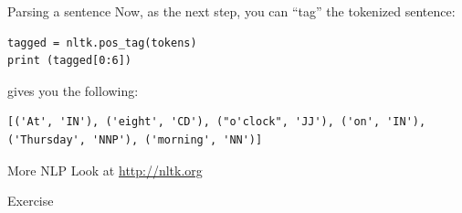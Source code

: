 \documentclass{beamer}
\begin{document}
\begin{frame}[fragile]{Parsing a sentence}
Now, as the next step, you can ``tag'' the tokenized sentence:
\begin{lstlisting}
tagged = nltk.pos_tag(tokens)
print (tagged[0:6])
\end{lstlisting}
gives you the following:
\begin{lstlisting}
[('At', 'IN'), ('eight', 'CD'), ("o'clock", 'JJ'), ('on', 'IN'),
('Thursday', 'NNP'), ('morning', 'NN')]
\end{lstlisting}


\end{frame}


\begin{frame}{More NLP}
\Huge{Look at \url{http://nltk.org}}

\end{frame}





\begin{frame}[plain]
Exercise
\end{frame}
\end{document}
